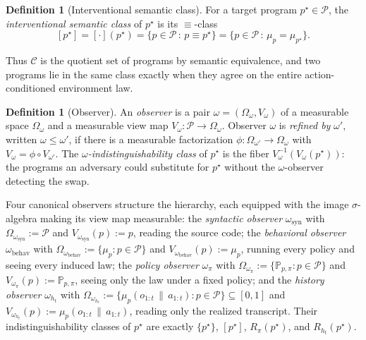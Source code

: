 \documentclass[11pt]{article}
\theoremstyle{definition}
\newtheorem{definition}[theorem]{Definition}
\theoremstyle{remark}
\newcommand{\Ccal}{\mathcal{C}}
\newcommand{\Pcal}{\mathcal{P}}
\newcommand{\Prob}{\mathbb{P}}
\newcommand{\givena}{\,\|\,}
\begin{document}
\begin{definition}[Interventional semantic class]
\label{def:int-sem-class}
For a target program $p^\star\in\Pcal$, the \emph{interventional semantic class} of $p^\star$ is its $\equiv$-class
\[
[p^\star]
=
[\cdot](p^\star)
=
\bigl\{p\in\Pcal\,:\,p\equiv p^\star\bigr\}
=
\bigl\{p\in\Pcal\,:\,\mu_p=\mu_{p^\star}\bigr\}.
\]
\end{definition}

Thus $\Ccal$ is the quotient set of programs by semantic equivalence, and two programs lie in the same class exactly when they agree on the entire action-conditioned environment law.

\begin{definition}[Observer]
\label{def:observer}
An \emph{observer} is a pair $\omega=(\Omega_\omega,V_\omega)$ of a measurable space $\Omega_\omega$ and a measurable view map $V_\omega:\Pcal\to\Omega_\omega$. Observer $\omega$ is \emph{refined by} $\omega'$, written $\omega\le\omega'$, if there is a measurable factorization $\phi:\Omega_{\omega'}\to\Omega_\omega$ with $V_\omega=\phi\circ V_{\omega'}$. The \emph{$\omega$-indistinguishability class} of $p^\star$ is the fiber $V_\omega^{-1}(V_\omega(p^\star))$: the programs an adversary could substitute for $p^\star$ without the $\omega$-observer detecting the swap.
\end{definition}

Four canonical observers structure the hierarchy, each equipped with the image $\sigma$-algebra making its view map measurable: the \emph{syntactic observer} $\omega_{\mathrm{syn}}$ with $\Omega_{\omega_{\mathrm{syn}}}:=\Pcal$ and $V_{\omega_{\mathrm{syn}}}(p):=p$, reading the source code; the \emph{behavioral observer} $\omega_{\mathrm{behav}}$ with $\Omega_{\omega_{\mathrm{behav}}}:=\{\mu_p:p\in\Pcal\}$ and $V_{\omega_{\mathrm{behav}}}(p):=\mu_p$, running every policy and seeing every induced law; the \emph{policy observer} $\omega_\pi$ with $\Omega_{\omega_\pi}:=\{\Prob_{p,\pi}:p\in\Pcal\}$ and $V_{\omega_\pi}(p):=\Prob_{p,\pi}$, seeing only the law under a fixed policy; and the \emph{history observer} $\omega_{h_t}$ with $\Omega_{\omega_{h_t}}:=\{\mu_p(o_{1:t}\givena a_{1:t}):p\in\Pcal\}\subseteq[0,1]$ and $V_{\omega_{h_t}}(p):=\mu_p(o_{1:t}\givena a_{1:t})$, reading only the realized transcript. Their indistinguishability classes of $p^\star$ are exactly $\{p^\star\}$, $[p^\star]$, $R_\pi(p^\star)$, and $R_{h_t}(p^\star)$.
\end{document}
